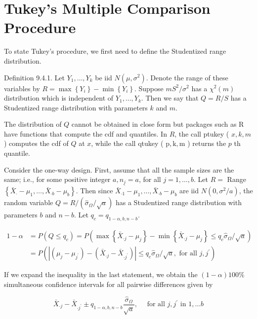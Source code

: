 \section*{Tukey's Multiple Comparison Procedure}
To state Tukey's procedure, we first need to define the Studentized range distribution.

Definition 9.4.1. Let $Y_{1}, \ldots, Y_{k}$ be iid $N\left(\mu, \sigma^{2}\right)$. Denote the range of these variables by $R=\max \left\{Y_{i}\right\}-\min \left\{Y_{i}\right\}$. Suppose $m S^{2} / \sigma^{2}$ has a $\chi^{2}(m)$ distribution which is independent of $Y_{1}, \ldots, Y_{k}$. Then we say that $Q=R / S$ has a Studentized range distribution with parameters $k$ and $m$.

The distribution of $Q$ cannot be obtained in close form but packages such as R have functions that compute the cdf and quantiles. In $R$, the call ptukey ( $x, k, m$ ) computes the cdf of $Q$ at $x$, while the call qtukey ( $\mathrm{p}, \mathrm{k}, \mathrm{m}$ ) returns the $p$ th quantile.

Consider the one-way design. First, assume that all the sample sizes are the same; i.e., for some positive integer $a, n_{\underline{j}}=a$, for all $j=1, \ldots, b$. Let $R=$ Range $\left\{\bar{X}_{\cdot}-\mu_{1}, \ldots, \bar{X}_{\cdot b}-\mu_{b}\right\}$. Then since $\bar{X}_{\cdot 1}-\mu_{1}, \ldots, \bar{X}_{\cdot b}-\mu_{b}$ are iid $N\left(0, \sigma^{2} / a\right)$, the random variable $Q=R /\left(\hat{\sigma}_{\Omega} / \sqrt{a}\right)$ has a Studentized range distribution with parameters $b$ and $n-b$. Let $q_{c}=q_{1-\alpha, b, n-b}$.

$$
\begin{aligned}
1-\alpha & =P\left(Q \leq q_{c}\right)=P\left(\max \left\{\bar{X}_{\cdot j}-\mu_{j}\right\}-\min \left\{\bar{X}_{\cdot j}-\mu_{j}\right\} \leq q_{c} \hat{\sigma}_{\Omega} / \sqrt{a}\right) \\
& =P\left(\left|\left(\mu_{j}-\mu_{j^{\prime}}\right)-\left(\bar{X}_{\cdot j}-\bar{X}_{\cdot j^{\prime}}\right)\right| \leq q_{c} \hat{\sigma}_{\Omega} / \sqrt{a}, \text { for all } j, j^{\prime}\right)
\end{aligned}
$$

If we expand the inequality in the last statement, we obtain the $(1-\alpha) 100 \%$ simultaneous confidence intervals for all pairwise differences given by


\begin{equation*}
\bar{X}_{\cdot j}-\bar{X}_{\cdot j^{\prime}} \pm q_{1-\alpha, b, n-b} \frac{\hat{\sigma}_{\Omega}}{\sqrt{a}}, \quad \text { for all } j, j^{\prime} \text { in } 1, \ldots b \tag{9.4.4}
\end{equation*}


